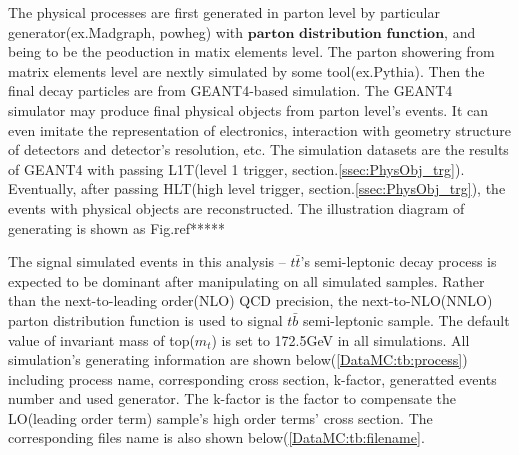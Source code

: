 		The physical processes are first generated in parton level by particular generator(ex.Madgraph\cite{Alwall:2011uj}, powheg\cite{Frixione:2007nu}) with $\textbf{parton distribution function}$, and being to be the peoduction in matix elements level. The parton showering from matrix elements level are nextly simulated by some tool(ex.Pythia\cite{Sjostrand:2014zea}). Then the final decay particles are from GEANT4-based\cite{Agostinelli:2002hh} simulation. The GEANT4 simulator may produce final physical objects from parton level's events. It can even imitate the representation of electronics, interaction with geometry structure of detectors and detector's resolution, etc. The simulation datasets are the results of GEANT4 with passing L1T(level 1 trigger, section.\ref{ssec:PhysObj_trg}). Eventually, after passing HLT(high level trigger, section.\ref{ssec:PhysObj_trg}), the events with physical objects are reconstructed. The illustration diagram of generating is shown as Fig.ref*****

		The signal simulated events in this analysis -- $t\bar{t}$'s semi-leptonic decay process is expected to be dominant after manipulating on all simulated samples. Rather than the next-to-leading order(NLO) QCD precision, the next-to-NLO(NNLO) parton distribution function\cite{Ball:2017nwa} is used to signal $t\bar{b}$ semi-leptonic sample. The default value of invariant mass of top($m_{t}$) is set to 172.5GeV in all simulations. All simulation's generating information are shown below(\ref{DataMC:tb:process}) including process name, corresponding cross section, k-factor, generatted events number and used generator. The k-factor is the factor to compensate the LO(leading order term) sample's high order terms' cross section. The corresponding files name is also shown below(\ref{DataMC:tb:filename}.


